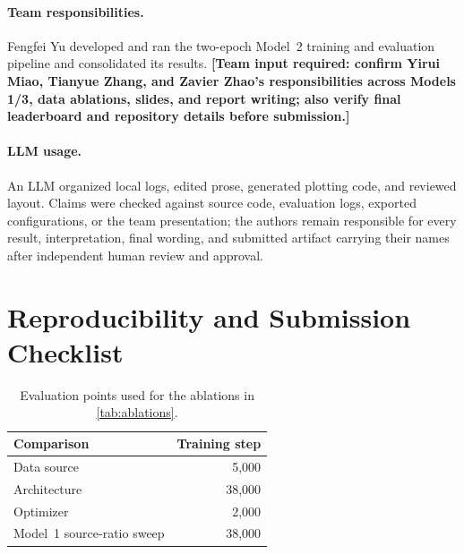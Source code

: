\documentclass{article}
\newcommand{\placeholder}[1]{\textcolor{reportred}{\textbf{[#1]}}}
\begin{document}
\paragraph{Team responsibilities.}
Fengfei Yu developed and ran the two-epoch Model~2 training and evaluation
pipeline and consolidated its results.
\placeholder{Team input required: confirm Yirui Miao, Tianyue Zhang, and
Zavier Zhao's responsibilities across Models 1/3, data ablations, slides, and
report writing; also verify final leaderboard and repository details before
submission.}

\paragraph{LLM usage.}
An LLM organized local logs, edited prose, generated plotting code, and
reviewed layout. Claims were checked against source code, evaluation logs,
exported configurations, or the team presentation; the authors remain
responsible for every result, interpretation, final wording, and submitted
artifact carrying their names after independent human review and approval.

\clearpage



\clearpage
\appendix
\section{Reproducibility and Submission Checklist}

\begin{table}[h]
  \centering
  \small
  \caption{Evaluation points used for the ablations in \cref{tab:ablations}.}
  \begin{tabular}{@{}lr@{}}
    \toprule
    Comparison & Training step \\
    \midrule
    Data source & 5,000 \\
    Architecture & 38,000 \\
    Optimizer & 2,000 \\
    Model~1 source-ratio sweep & 38,000 \\
    \bottomrule
  \end{tabular}
\end{table}
\end{document}
